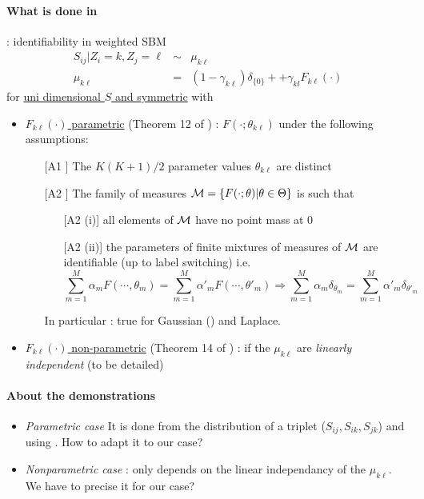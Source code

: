 \paragraph{What is done in    \cite{AMR10}}: identifiability in weighted SBM 
\begin{eqnarray*}
S_{ij} | Z_i =k ,Z_j = \ell &\sim& \mu_{k\ell}\\
  \mu_{k\ell} &=& (1-\gamma_{k\ell})  \delta_ {\{0\}} + + \gamma_{kl} F_{k\ell}( \cdot)
\end{eqnarray*}
 for \underline{uni dimensional $S$ and symmetric}  with 
\begin{itemize} 
\item \underline{ $ F_{k\ell}( \cdot)$ parametric} (Theorem 12 of \cite{AMR10})  : $ F( \cdot; \theta_{k\ell})$ under the following assumptions: 
\begin{enumerate}
\item[[A1]]  The $K(K+1)/2$ parameter values $\theta_{k\ell}$ are distinct
\item[[A2]]  The family of measures $\mathcal{M} = \{ F( \cdot; \theta) | \theta\in\Theta\}$  is such that 
\begin{itemize}
\item[[A2](i)] all elements of $\mathcal{M}$ have no point mass at $0$ 
\item[[A2](ii)] the parameters of finite mixtures of  measures of $\mathcal{M}$ are identifiable (up to label switching) i.e.
$$ \sum_{m=1}^M \alpha_m F(\cdots, \theta_m) =  \sum_{m=1}^M \alpha'_m F(\cdots, \theta'_m) \Rightarrow  \sum_{m=1}^M \alpha_m \delta_{\theta_m} =  \sum_{m=1}^M \alpha'_m \delta_{\theta'_m} $$ 
\end{itemize}

In particular : true for Gaussian (\cite{T63}) and Laplace. 
\end{enumerate}
\item \underline{ $ F_{k\ell}( \cdot)$ non-parametric} (Theorem 14 of \cite{AMR10}) : if the $\mu_{k \ell}$ are \emph{linearly independent} (to be detailed)
\end{itemize}


\paragraph{About the demonstrations} 

\begin{itemize}
\item  \emph{Parametric case}  It is done from the distribution of a triplet ($S_{ij},S_{ik}, S_{jk}$) and using \cite{T63}. How to adapt it  to our case? %
\item  \emph{Nonparametric case} : only depends on the linear independancy of the $\mu_{k\ell}$. We have to precise it for our case? 
\end{itemize}


